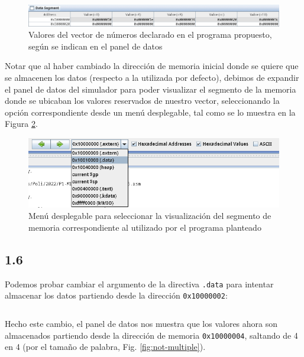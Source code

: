 \documentclass[a4paper]{report}
\begin{document}
\begin{figure}[h]
    \centering
    \captionsetup{justification = centering}
    \includegraphics[width=.95\linewidth]{img/c1-5a}
    \caption{Valores del vector de números declarado en el programa propuesto, según se indican en el panel de datos}
    \label{fig:arr5-mem}
\end{figure}

Notar que al haber cambiado la dirección de memoria inicial donde se quiere que se almacenen los datos (respecto a la utilizada por defecto), debimos de expandir el panel de datos del simulador para poder visualizar el segmento de la memoria donde se ubicaban los valores reservados de nuestro vector, seleccionando la opción correspondiente desde un menú desplegable, tal como se lo muestra en la Figura \ref{fig:dropdown-data}.


\begin{figure}[h]
    \centering
    \captionsetup{justification = centering}
    \includegraphics[width=.7\linewidth]{img/c1-5b}
    \caption{Menú desplegable para seleccionar la visualización del segmento de memoria correspondiente al utilizado por el programa planteado}
    \label{fig:dropdown-data}
\end{figure}

\subsection*{1.6}

Podemos probar cambiar el argumento de la directiva \texttt{.data} para intentar almacenar los datos partiendo desde la dirección \texttt{0x10000002}:

\vspace{7pt}
\inputminted[linenos]{gas}{src/cuestiones/c1-6.asm}
\vspace{7pt}

Hecho este cambio, el panel de datos nos muestra que los valores ahora son almacenados partiendo desde la dirección de memoria \texttt{0x10000004}, saltando de 4 en 4 (por el tamaño de palabra, Fig. \ref{fig:not-multiple}).
\end{document}
